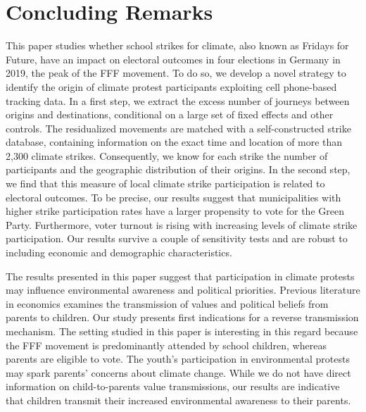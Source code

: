 










\bigskip
\section{Concluding Remarks}\label{sec_greta_cons:conclusion}

This paper studies whether school strikes for climate, also known as Fridays for Future, have an impact on electoral outcomes in four elections in Germany in 2019, the peak of the FFF movement. To do so, we develop a novel strategy to identify the origin of climate protest participants exploiting cell phone-based tracking data. In a first step, we extract the excess number of journeys between origins and destinations, conditional on a large set of fixed effects and other controls. The residualized movements are matched with a self-constructed strike database, containing information on the exact time and location of more than 2,300 climate strikes. Consequently, we know for each strike the number of participants and the geographic distribution of their origins. In the second step, we find that this measure of local climate strike participation is related to electoral outcomes. To be precise, our results suggest that municipalities with higher strike participation rates have a larger propensity to vote for the Green Party. Furthermore, voter turnout is rising with increasing levels of climate strike participation. Our results survive a couple of sensitivity tests and are robust to including economic and demographic characteristics.




The results presented in this paper suggest that participation in climate protests may influence environmental awareness and political priorities. Previous literature in economics examines the transmission of values and political beliefs from parents to children. Our study presents first indications for a reverse transmission mechanism. The setting studied in this paper is interesting in this regard because the FFF movement is predominantly attended by school children, whereas parents are eligible to vote. The youth's participation in environmental protests may spark parents' concerns about climate change. While we do not have direct information on child-to-parents value transmissions, our results are indicative that children transmit their increased environmental awareness to their parents.



